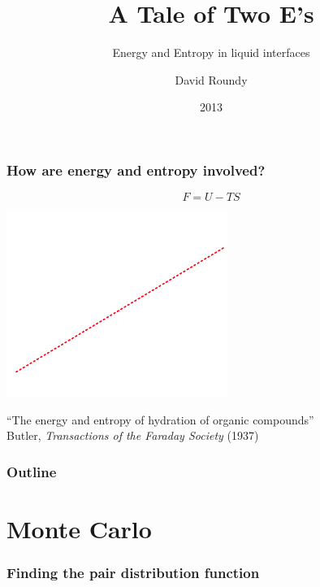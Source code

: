 \documentclass{beamer}
\title{A Tale of Two E's}
\subtitle{Energy and Entropy in liquid interfaces}
\author{David Roundy}
\date{2013}
\newcommand\mycite[3]{{\small #1, \textit{#2} (#3)}}
\begin{document}
{
\begin{frame}
  \titlepage

\end{frame}
}

\begin{frame}
  \frametitle{How are energy and entropy involved?}
  \vspace{-1em}
  \[F = U - TS\]
  \begin{center}
    \includegraphics[height=6cm]{figs/hydration-plot-nice}
  \end{center}
  ``The energy and entropy of hydration of organic compounds''
  \\ \hfill \mycite{Butler}{Transactions of the Faraday Society}{1937}
\end{frame}

\begin{frame}
  \frametitle{Outline}
  \tableofcontents
\end{frame}





\section{Monte Carlo}

\begin{frame}
  \frametitle{Finding the pair distribution function}
  \begin{figure}[h]
    \centering
  \end{figure}
\end{frame}
\end{document}
